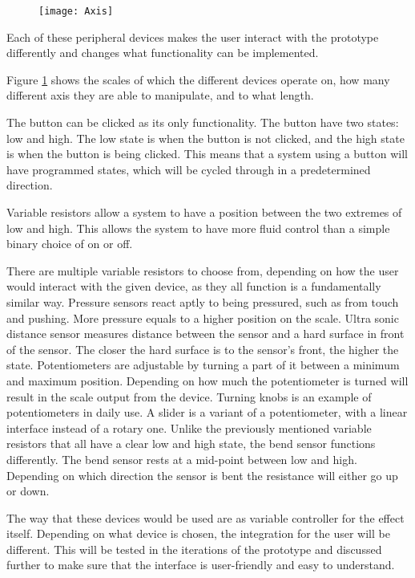 \begin{figure}[!h] 
\centering
\texttt{[image: Axis]}
\caption{\label{fig:axis}}
\end{figure}

Each of these peripheral devices makes the user interact with the prototype differently and changes what functionality can be implemented.

Figure \ref{fig:axis} shows the scales of which the different devices operate on, how many different axis they are able to manipulate, and to what length.
 
The button can be clicked as its only functionality. The button have two states: low and high. The low state is when the button is not clicked, and the high state is when the button is being clicked. This means that a system using a button will have programmed states, which will be cycled through in a predetermined direction.

Variable resistors allow a system to have a position between the two extremes of low and high. This allows the system to have more fluid control than a simple binary choice of on or off.

There are multiple variable resistors to choose from, depending on how the user would interact with the given device, as they all function is a fundamentally similar way. Pressure sensors react aptly to being pressured, such as from touch and pushing. More pressure equals to a higher position on the scale.
Ultra sonic distance sensor measures distance between the sensor and a hard surface in front of the sensor. The closer the hard surface is to the sensor's front, the higher the state.
Potentiometers are adjustable by turning a part of it between a minimum and maximum position. Depending on how much the potentiometer is turned will result in the scale output from the device. Turning knobs is an example of potentiometers in daily use.
A slider is a variant of a potentiometer, with a linear interface instead of a rotary one.
Unlike the previously mentioned variable resistors that all have a clear low and high state, the bend sensor functions differently. The bend sensor rests at a mid-point between low and high. Depending on which direction the sensor is bent the resistance will either go up or down.

The way that these devices would be used are as variable controller for the effect itself. Depending on what device is chosen, the integration for the user will be different. This will be tested in the iterations of the prototype and discussed further to make sure that the interface is user-friendly and easy to understand. 

